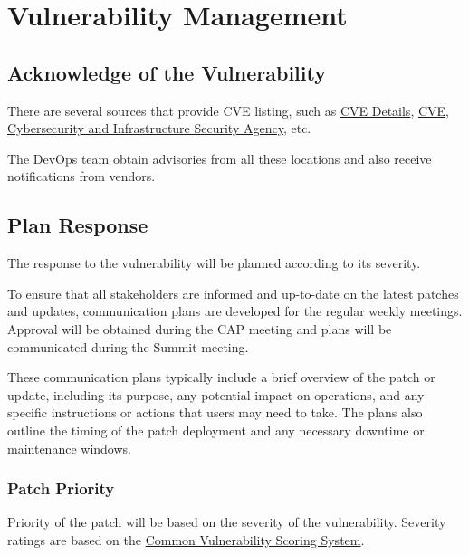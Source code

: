 \section{Vulnerability Management}

\subsection{Acknowledge of the Vulnerability}

There are several sources that provide CVE listing, such as \href{https://https://www.cvedetails.com/}{CVE Details}, \href{https://cve.org/}{CVE}, \href{https://www.cisa.gov/known-exploited-vulnerabilities-catalog}{Cybersecurity and Infrastructure Security Agency}, etc. 

The DevOps team obtain advisories from all these locations and also receive notifications from vendors. 

\subsection{Plan Response}

The response to the vulnerability will be planned according to its severity.

To ensure that all stakeholders are informed and up-to-date on the latest patches and updates, communication plans are developed for the regular weekly meetings. Approval will be obtained during the CAP meeting and plans will be communicated during the Summit meeting. 

These communication plans typically include a brief overview of the patch or update, including its purpose, any potential impact on operations, and any specific instructions or actions that users may need to take. The plans also outline the timing of the patch deployment and any necessary downtime or maintenance windows. 

\subsubsection{Patch Priority}

Priority of the patch will be based on the severity of the vulnerability.
Severity ratings are based on the \href{https://nvd.nist.gov/vuln-metrics/cvss}{Common Vulnerability Scoring System}.  

